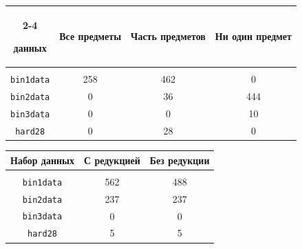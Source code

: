 \begin{table}
\begin{center}
\begin{tabular}{|c|c|c|c|}
\cline{2-4}

данных& Все предметы & Часть предметов & Ни один предмет\\

\hline

       &&&\\[-10pt]

                \texttt{bin1data} & 258& 462\hphantom{9}& \hphantom{9}0\\

                \texttt{bin2data} & \hphantom{99}0 & 36& 444\hphantom{9}\\

                \texttt{bin3data} & \hphantom{99}0& \hphantom{9}0& 10\\

                \texttt{hard28}& \hphantom{99}0& 28& \hphantom{9}0\\

     \hline

\end{tabular}

\end{center}   



\begin{center}

\parbox{210pt}{

}



    \label{tab:red_optimus}

\vspace*{2ex}



    \begin{tabular}{|c|c|c|}

    \hline

       \multicolumn{1}{|c|}{Набор данных}  & С редукцией &Без редукции\\

       \hline

             &&\\[-10pt]

       \texttt{bin1data} & 562& 488\\

       \texttt{bin2data} & 237& 237\\

       \texttt{bin3data} & \hphantom{99}0&\hphantom{99}0\\

       \texttt{hard28}&\hphantom{99}5&\hphantom{99}5\\

     \hline

           \end{tabular}

\end{center}

\end{table}



